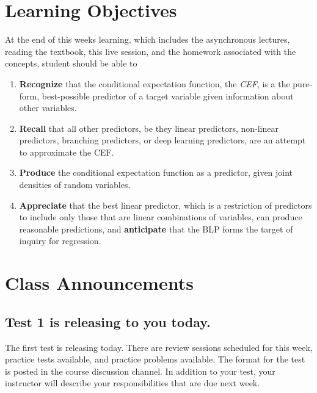 \documentclass[
]{book}
\providecommand{\tightlist}{%
  \setlength{\itemsep}{0pt}\setlength{\parskip}{0pt}}
\theoremstyle{definition}
\theoremstyle{definition}
\theoremstyle{definition}
\theoremstyle{definition}
\theoremstyle{remark}
\begin{document}
\hypertarget{learning-objectives-3}{%
\section{Learning Objectives}\label{learning-objectives-3}}

At the end of this weeks learning, which includes the asynchronous lectures, reading the textbook, this live session, and the homework associated with the concepts, student should be able to

\begin{enumerate}
\def\labelenumi{\arabic{enumi}.}
\tightlist
\item
  \textbf{Recognize} that the conditional expectation function, the \emph{CEF}, is a the pure-form, best-possible predictor of a target variable given information about other variables.
\item
  \textbf{Recall} that all other predictors, be they linear predictors, non-linear predictors, branching predictors, or deep learning predictors, are an attempt to approximate the CEF.
\item
  \textbf{Produce} the conditional expectation function as a predictor, given joint densities of random variables.
\item
  \textbf{Appreciate} that the best linear predictor, which is a restriction of predictors to include only those that are linear combinations of variables, can produce reasonable predictions, and \textbf{anticipate} that the BLP forms the target of inquiry for regression.
\end{enumerate}

\hypertarget{class-announcements-2}{%
\section{Class Announcements}\label{class-announcements-2}}

\hypertarget{test-1-is-releasing-to-you-today.}{%
\subsection{Test 1 is releasing to you today.}\label{test-1-is-releasing-to-you-today.}}

The first test is releasing today. There are review sessions scheduled for this week, practice tests available, and practice problems available. The format for the test is posted in the course discussion channel. In addition to your test, your instructor will describe your responsibilities that are due next week.
\end{document}
